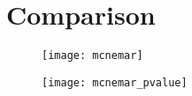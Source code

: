 
\section{Comparison}%
\label{sec:comparison}


\begin{figure}[H]
\centering
\texttt{[image: mcnemar]}
\end{figure}

\begin{figure}[H]
\centering
\texttt{[image: mcnemar\_pvalue]}
\end{figure}